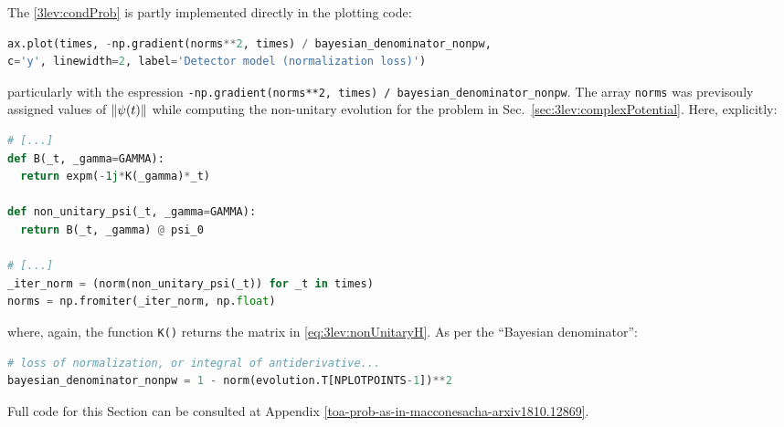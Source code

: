 The \eqref{3lev:condProb} is partly implemented
directly in the plotting code:
\begin{lstlisting}[language=Python]
ax.plot(times, -np.gradient(norms**2, times) / bayesian_denominator_nonpw,
c='y', linewidth=2, label='Detector model (normalization loss)')
\end{lstlisting}
particularly with the espression
\lstinline{-np.gradient(norms**2, times) / bayesian_denominator_nonpw}.
The array \Verb!norms! was previsouly assigned values of $\norm{\psi(t)}$
while computing the non-unitary evolution for the problem in Sec.~\ref{sec:3lev:complexPotential}.
Here, explicitly:
\begin{lstlisting}[language=Python]
# [...]
def B(_t, _gamma=GAMMA):
  return expm(-1j*K(_gamma)*_t)

def non_unitary_psi(_t, _gamma=GAMMA):
  return B(_t, _gamma) @ psi_0

# [...]
_iter_norm = (norm(non_unitary_psi(_t)) for _t in times)
norms = np.fromiter(_iter_norm, np.float)
\end{lstlisting}
where, again, the function \Verb!K()! returns the matrix in \eqref{eq:3lev:nonUnitaryH}.
As per the ``Bayesian denominator'':
\begin{lstlisting}[language=Python]
# loss of normalization, or integral of antiderivative...
bayesian_denominator_nonpw = 1 - norm(evolution.T[NPLOTPOINTS-1])**2
\end{lstlisting}

Full code for this Section can be consulted at Appendix \ref{toa-prob-as-in-macconesacha-arxiv1810.12869}.
